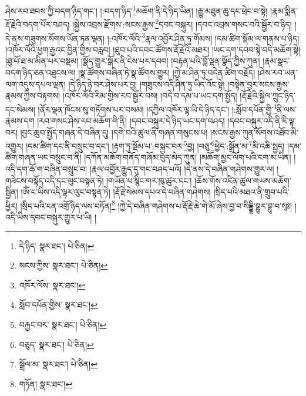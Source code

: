 ཤེས་རབ་ཐབས་ཀྱི་བདག་ཉིད་གང་། །:བདག་ཉིད་\footnote{དེ་ཉིད་  སྣར་ཐང་།  པེ་ཅིན། }མཆོག་ནི་དེ་ཉིད་ཡིན། །རྒྱུ་མཐུན་ཆུ་དང་ཕྲེང་བ་སྟེ། །རྣམ་སྨིན་རྡོ་རྗེའི་བདག་པོར་བཤད། །སྐྱེས་འབྲས་རྫོགས་:སངས་རྒྱས་\footnote{སངས་ཀྱིས་  སྣར་ཐང་།  པེ་ཅིན། }དབང་བསྐུར། །དབང་འབྲས་གསང་བའི་སྦྱོར་བ་ཉིད། །དེ་ནས་གཟུགས་སོགས་ཡོན་ཏན་ལྡན། །:འཁོར་ལོའི་\footnote{འཁོར་ལོས་  སྣར་ཐང་། }རྣལ་འབྱོར་ཤིན་ཏུ་གོམས། །དམ་ཚིག་སྡོམ་ལ་གནས་པ་ཉིད། །འཁོར་ལོའི་ཕྱག་རྒྱའང་བྱིན་གྱིས་བརླབ། །ཐུབ་པའི་དབང་ཚོགས་རྡོ་རྗེའི་མཐར། །ཡང་དག་དབབ་སྟེ་བདེ་མཆོག་སྟེ། །ཐུ་པོ་ཐ་མ་མིན་པར་བསྡམ། །སྣོད་གྱུར་སྒོར་ནི་ངེས་པར་དབབ། །བརྟན་པའི་བློ་ལྡན་སྣོད་ཀྱིས་ཀུན། །རྣམ་སྣང་བདག་ཉིད་ཅན་འཐུངས་ལ། །སྣ་ཚོགས་བཞིན་ཏེ་སྣ་ཚོགས་གྱུར། །ཀྱེ་མ་ཤིན་ཏུ་བདེན་ཚིག་བརྗོད། །ཤེས་རབ་ཡན་ལག་འདུས་དཔལ་ལྡན། །དེ་ཉིད་ཉེ་བར་ཤེས་པར་བྱ། །གཟུངས་འདི་ཤིན་ཏུ་ཡིད་འོང་སྟེ། །བསྟེན་བྱར་སངས་རྒྱས་རྣམས་ཀྱིས་བརྟགས། །འཁོར་ལོའི་རིམ་གྱིས་རབ་སྦྱོར་བས། །བདེ་བ་དམ་པ་ཡང་དག་སྤྱོད། །རྡོ་རྗེའི་སྐྱིལ་ཀྲུང་ཉིད་དང་སེམས། །ནོར་ལྡན་ཁོངས་སུ་གཏོགས་པར་བསམ། །དཀྱིལ་འཁོར་ལྷ་ཡི་དེ་ཉིད་དང་། །:སློབ་དཔོན་གྱི་\footnote{སློབ་དཔོན་གྱིས་  སྣར་ཐང་། }ནི་ལས་རྣམས་དག །རབ་གསང་ཤེས་རབ་མཆོག་གི་ནི། །དབང་བསྐུར་དེ་ཉིད་ཡང་དག་བཤད། །དབང་བསྐུར་འདི་ནི་ཇི་ལྟ་བར། །བྱང་ཆུབ་སྤྱོད་གཞན་དེ་བཞིན་དུ། །དགེ་བའི་ཚུལ་ནི་གཞན་གསུངས་པ། །སངས་རྒྱས་ཀུན་སོགས་འཐོབ་མི་འགྱུར། །དམ་ཚིག་དང་ནི་བསྲུང་བ་དང་། །རྟག་ཏུ་སྡོམ་པ་:བསྐྱང་བར་\footnote{བརྐྱང་བར་  སྣར་ཐང་།  པེ་ཅིན། }བྱ། །བཅུ་\footnote{བཅུད་  སྣར་ཐང་།  པེ་ཅིན། }ཕྱེད་:སྒྲོན་མ་\footnote{སྒྲོལ་མ་  སྣར་ཐང་།  པེ་ཅིན། }མི་འཆི་སྤྱད། །དམ་ཚིག་གཞན་ཡང་བསྲུང་བ་ནི། །དཀོན་མཆོག་གནོད་གཞོམ་བུད་མེད་ཀུན། །མཆོག་མྱང་ལོག་པའི་ངག་མ་ཡིན། །འདི་དག་ཆོ་ག་བཞིན་བསྲུང་བ། །རྣལ་འབྱོར་རྒྱུད་དུ་གང་བཤད་པའོ། །དེ་ནས་དེ་བཞིན་གཤེགས་གྱུར་ལ། །གཟེངས་བསྟོད་འདི་དང་ལུང་བསྟན་ཏེ། །གཡོན་པ་སྙིང་གར་ཁུ་ཚུར་དང་། །ཆོས་གོས་འཛིན་ཚུལ་གཡས་མཆོག་སྦྱིན། །ཨོཾ་ང་ཡིས་འདི་ལྟར་ལུང་བསྟན་ཏེ། །རྡོ་རྗེ་སེམས་དཔའ་དེ་བཞིན་གཤེགས། །སྲིད་པའི་མཐའ་ནི་གྲུབ་པའི་ཕྱིར། །སྲིད་པའི་ངན་འགྲོ་ཉིད་ལས་བཏོན།\footnote{གཏོན།  སྣར་ཐང་། } །ཀྱེ་དེ་བཞིན་གཤེགས་པ་རྡོ་རྗེ་ཆེ་གེ་མོ་ཞེས་བྱ་བ་སིདྡྷི་བྷུར་བྷུ་བ་སྭཿ། །འདི་ཡིས་དབང་བསྐུར་གྱུར་པ་ཡི། །
